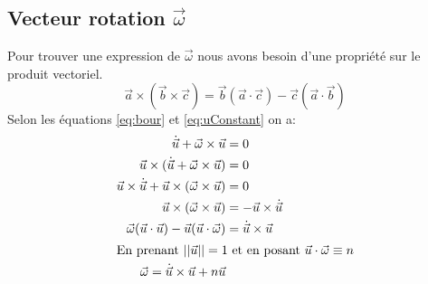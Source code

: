 \documentclass[12pt,a4paper]{article}
\begin{document}
	\subsection{Vecteur rotation $\vec{\omega}$}
	\label{subsec:omega}
	Pour trouver une expression de $\vec{\omega}$ nous avons besoin d'une propriété sur le produit vectoriel.
	\begin{equation}
	\vec{a}\times(\vec{b}\times\vec{c})=\vec{b}(\vec{a}\cdot\vec{c})-\vec{c}(\vec{a}\cdot\vec{b})
	\end{equation}
	Selon les équations \eqref{eq:bour} et \eqref{eq:uConstant} on a:
	\begin{align*}
	\dot{\vec{u}}+\vec{\omega}\times\vec{u}         &= 0\\
	\vec{u}\times(\dot{\vec{u}}+\vec{\omega}\times\vec{u})     &= 0\\
	\vec{u}\times\dot{\vec{u}}+\vec{u}\times(\vec{\omega}\times\vec{u})  &= 0\\
	\vec{u}\times(\vec{\omega}\times\vec{u})        &=-\vec{u}\times\dot{\vec{u}}\\
	\vec{\omega}(\vec{u}\cdot\vec{u})-\vec{u}(\vec{u}\cdot\vec{\omega})  &=\dot{\vec{u}}\times\vec{u}\\
	\intertext{En prenant $||\vec{u}||=1$ et en posant $\vec{u}\cdot\vec{\omega}\equiv n$}
	\vec{\omega}=\dot{\vec{u}}\times\vec{u}+n\vec{u}
	\end{align*}
	
\end{document}

